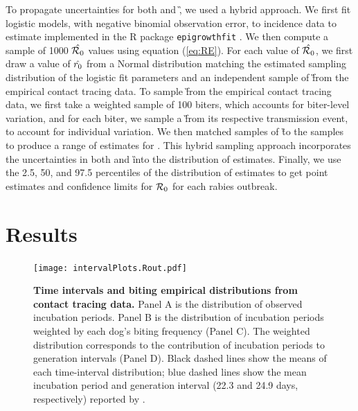 To propagate uncertainties for both \littler and \G, we used a hybrid approach.
We first fit logistic models, with negative binomial observation error, to incidence data to estimate \littler implemented in the R package {\tt epigrowthfit} \cite{epigrowthfit}.
We then compute a sample of 1000 $\hat{{\mathcal R}_0}$ values using equation (\ref{eq:RE}).
For each value of $\hat{{\mathcal R}_0}$, we first draw a value of $\hat{r_0}$ from a Normal distribution matching the estimated sampling distribution of the logistic fit parameters and an independent sample of \G from the empirical contact tracing data. To sample \G from the empirical contact tracing data, we first take a weighted sample of 100 biters, which accounts for biter-level variation, and for each biter, we sample a \G from its respective transmission event, to account for individual variation.
We then matched samples of \G to the \littler samples to produce a range of estimates for \rzero.
This hybrid sampling approach incorporates the uncertainties in both \littler and \G
into the distribution of \rzero estimates.
Finally, we use the 2.5, 50,  and 97.5 percentiles of the distribution of \rzero estimates to get point estimates and confidence limits for ${\mathcal R}_0$ for each rabies outbreak.

\section*{Results}

\begin{center}
\begin{figure}[ht!]
\texttt{[image: intervalPlots.Rout.pdf]}
\caption{\textbf{Time intervals and biting empirical distributions from contact tracing data.}
Panel A is the distribution of observed incubation periods. Panel B is the distribution of incubation periods weighted by each dog's biting frequency (Panel C). The weighted distribution corresponds to the contribution of incubation periods to generation intervals (Panel D).
Black dashed lines show the means of each time-interval distribution; blue dashed lines show the mean incubation period and generation interval (22.3 and 24.9 days, respectively) reported by \cite{hampson2009transmission}.
}
\end{figure}
\end{center}

\FloatBarrier

